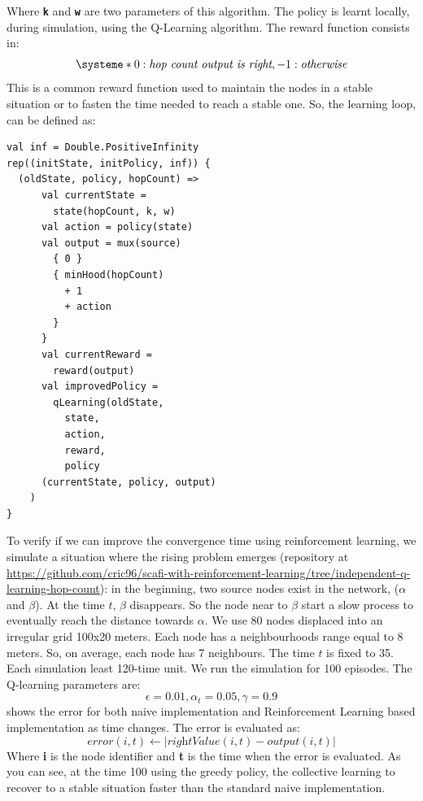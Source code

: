 \documentclass[conference]{IEEEtran}
\begin{document}
Where \textbf{\texttt{k}} and \textbf{\texttt{w}} are two parameters of this algorithm.
%
The policy is learnt locally, during simulation, using the Q-Learning algorithm. 
 The reward function consists in: 
\[
\systeme*{0 : \textit{hop count output is right}, -1 : \textit{otherwise}}
\]
This is a common reward function used to maintain the nodes in a stable situation or to
 fasten the time needed to reach a stable one.
%
So, the learning loop, can be defined as:
\begin{verbatim}
val inf = Double.PositiveInfinity
rep((initState, initPolicy, inf)) {
  (oldState, policy, hopCount) => 
      val currentState = 
        state(hopCount, k, w)
      val action = policy(state)
      val output = mux(source) 
        { 0 } 
        { minHood(hopCount) 
          + 1 
          + action
        } 
      }
      val currentReward = 
        reward(output)
      val improvedPolicy = 
        qLearning(oldState, 
          state, 
          action, 
          reward,
          policy
      (currentState, policy, output)
    )
}
\end{verbatim}

To verify if we can improve the convergence time using reinforcement learning,
 we simulate a situation where the rising problem emerges (repository at \url{https://github.com/cric96/scafi-with-reinforcement-learning/tree/independent-q-learning-hop-count}):
 in the beginning, two source nodes exist in the network, ($\alpha$ and $\beta$).
 At the time $t$, $\beta$ disappears. So the node near to $\beta$ start a slow process
 to eventually reach the distance towards $\alpha$.
%
We use 80 nodes displaced into an irregular grid 100x20 meters. 
 Each node has a neighbourhoods range equal to 8 meters. 
 So, on average, each node has 7 neighbours.
 The time $t$ is fixed to 35.
 Each simulation least 120-time unit.
% 
We run the simulation for 100 episodes.
 The Q-learning parameters are:
$$
\epsilon = 0.01, 
\alpha_t = 0.05,
\gamma = 0.9
$$
 shows the error for both naive implementation and Reinforcement Learning based implementation as time changes.
The error is evaluated as:
$$
error(i, t) \leftarrow  | \textit{rightValue}(i,t) - \textit{output}(i,t) |
$$
Where \textbf{i} is the node identifier and \textbf{t} is the time when the error is evaluated.
%
As you can see, at the time 100 using the greedy policy, the collective learning to recover to a stable situation
 faster than the standard naive implementation.
\end{document}
